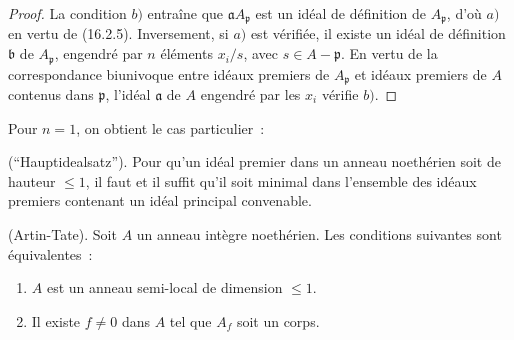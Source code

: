 \begin{proof}
La condition $b)$ entraîne que $\mathfrak{a}A_{\mathfrak{p}}$ est un idéal de
définition de $A_{\mathfrak{p}}$, d'où $a)$ en vertu de (16.2.5).
Inversement, si $a)$ est vérifiée, il existe un idéal de définition
$\mathfrak{b}$ de $A_{\mathfrak{p}}$, engendré par $n$ éléments $x_i/s$, avec
$s\in A-\mathfrak{p}$. En vertu de la correspondance biunivoque entre idéaux
premiers de $A_{\mathfrak{p}}$ et idéaux premiers de $A$ contenus dans
$\mathfrak{p}$, l'idéal $\mathfrak{a}$ de $A$ engendré par les $x_i$ vérifie
$b)$.
\end{proof}


Pour $n=1$, on obtient le cas particulier~:

\begin{corollary}[16.3.2]
\label{0.16.3.2-fr}
\textup{(``Hauptidealsatz'').}
Pour qu'un idéal premier dans un anneau noethérien soit de hauteur $\leq1$, il
faut et il suffit qu'il soit minimal dans l'ensemble des idéaux premiers
contenant un idéal principal convenable.
\end{corollary}

\begin{corollary}[16.3.3]
\label{0.16.3.3-fr}
\textup{(Artin-Tate).}
Soit $A$ un anneau intègre noethérien. Les conditions suivantes sont
équivalentes~:
\begin{enumerate}
  \item[$a)$] $A$ est un anneau semi-local de dimension $\leq1$.
  \item[$b)$] Il existe $f\neq0$ dans $A$ tel que $A_f$ soit un corps.
\end{enumerate}
\end{corollary}

